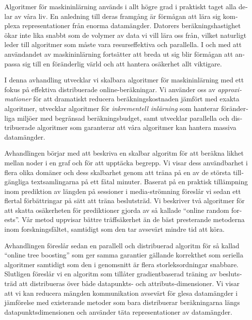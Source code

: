 
\begin{sammanfattning}

\begin{otherlanguage}{swedish}
	Algoritmer för maskininlärning används i allt högre grad i praktiskt taget alla delar av våra liv. En anledning till deras framgång är förmågan att lära sig komplexa representationer från enorma datamängder. Datorers beräkningshastighet ökar inte lika snabbt som de volymer av data vi vill lära oss från, vilket naturligt leder till algoritmer som måste vara resurseffektiva och parallella.
	I och med att användandet av maskininlärning fortsätter att breda ut sig blir förmågan att anpassa sig till en föränderlig värld och att hantera osäkerhet allt viktigare.

	I denna avhandling utvecklar vi skalbara algoritmer för maskininlärning med ett fokus på effektiva distribuerade online-beräkningar. Vi använder oss av \emph{approximationer} för att dramatiskt reducera beräkningskostnaden jämfört med exakta algoritmer, utvecklar algoritmer för \emph{inkrementell inlärning} som hanterar föränderliga miljöer med begränsad beräkningsbudget, samt utvecklar parallella och distribuerade algoritmer som garanterar att våra algoritmer kan hantera massiva datamängder.

	Avhandlingen börjar med att beskriva en skalbar algoritm för att beräkna likhet mellan noder i en graf och för att upptäcka begrepp. Vi visar dess användbarhet i flera olika domäner och dess skalbarhet genom att träna på en av de största tillgängliga textsamlingarna på ett fåtal minuter.
	Baserat på en praktisk tillämpning inom prediktion av längden på sessioner i media-strömning föreslår vi sedan ett flertal förbättringar på sätt att träna beslutsträd. Vi beskriver två algoritmer för att skatta osäkerheten för prediktioner gjorda av så kallade ``online random forests''. Vår metod uppvisar bättre träffsäkerhet än de bäst presterande metoderna inom forskningsfältet, samtidigt som den tar avsevärt mindre tid att köra.

	Avhandlingen föreslår sedan en parallell och distribuerad algoritm för så kallad ``online tree boosting'' som ger samma garantier gällande korrekthet som seriella algoritmer samtidigt som den i genomsnitt är flera storleksordningar snabbare.
	Slutligen föreslår vi en algoritm som tillåter gradientbaserad träning av beslutsträd att distribueras över både datapunkts- och attributs-dimensioner. Vi visar att vi kan reducera mängden kommunikation avsevärt för glesa datamängder i jämförelse med existerande metoder som bara distribuerar beräkningarna längs datapunktsdimensionen och använder täta representationer av datamängder.
\end{otherlanguage}

\end{sammanfattning}


